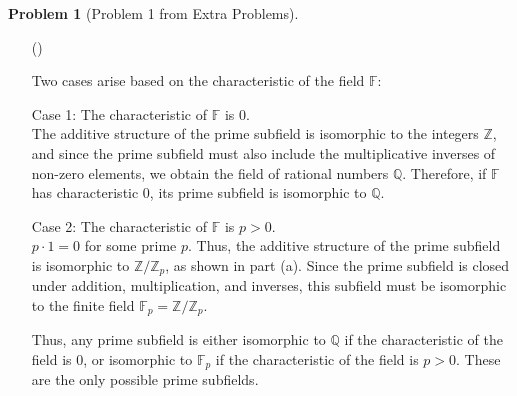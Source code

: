 \documentclass[12pt]{article}
\theoremstyle{definition}
\newtheorem{problem}{Problem}
\newcounter{subq}[problem]
\newenvironment{subproblem}
{\refstepcounter{subq} \begin{itemize} \item[(\alph{subq})]}
{\end{itemize} \medskip}
\begin{document}
\begin{problem}[Problem 1 from Extra Problems]
\begin{subproblem}
\begin{solution}
        Two cases arise based on the characteristic of the field \( \mathbb{F} \):

        Case 1: The characteristic of \( \mathbb{F} \) is 0.\\
        The additive structure of the prime subfield is isomorphic to the integers \( \mathbb{Z} \), and since the prime subfield must also include the multiplicative inverses of non-zero elements, we obtain the field of rational numbers \( \mathbb{Q} \). Therefore, if \( \mathbb{F} \) has characteristic 0, its prime subfield is isomorphic to \( \mathbb{Q} \).

        Case 2: The characteristic of \( \mathbb{F} \) is \( p > 0 \).\\
        \( p \cdot 1 = 0 \) for some prime \( p \). Thus, the additive structure of the prime subfield is isomorphic to \( \mathbb{Z}/\mathbb{Z}_p \), as shown in part (a). Since the prime subfield is closed under addition, multiplication, and inverses, this subfield must be isomorphic to the finite field \( \mathbb{F}_p = \mathbb{Z}/\mathbb{Z}_p \).

        Thus, any prime subfield is either isomorphic to \( \mathbb{Q} \) if the characteristic of the field is 0, or isomorphic to \( \mathbb{F}_p \) if the characteristic of the field is \( p > 0 \). These are the only possible prime subfields.
        \end{solution}
    \end{subproblem}
\end{problem}
\end{document}
